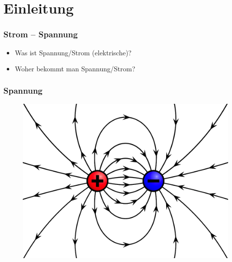 

\subtitle{Technik 02: \\
          Spannung und Strom, Wechselspannung \\[2em]}
\date{Stand 27.10.2016}



\section*{Einleitung}

\begin{frame}
    \frametitle{Strom -- Spannung}
    \begin{itemize}
		\item Was ist Spannung/Strom (elektrische)?
		\item Woher bekommt man Spannung/Strom?
    \end{itemize}
\end{frame}

\begin{frame}
    \frametitle{Spannung}
    \begin{center}
\begin{figure}
 		\includegraphics[width=.6\textwidth,height=.75\textheight,keepaspectratio]{e02/ladung.png}      
\end{figure}    
\end{center}
\end{frame}


